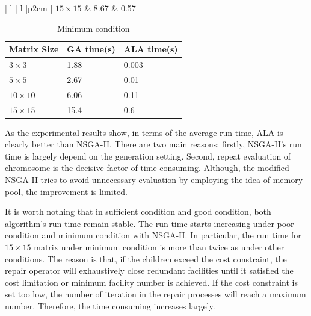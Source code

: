 \documentclass{llncs}
\begin{document}
\begin{table}[!htb]
\begin{minipage}{.5\linewidth}
\begin{tabular}{ | l | l |p{2cm} |}
		$15 \times 15$  & 8.67 & 0.57\\ \hline
	\end{tabular}
	\end{minipage}
	\label{table:poor}
\begin{minipage}{.5\linewidth}
	\caption{Minimum condition}
	\begin{tabular}{ | l | l |p{2cm} |}
		\hline
		Matrix Size & GA time(s) & ALA time(s)\\ \hline
		$3 \times 3$  & 1.88 & 0.003\\ \hline
		$5 \times 5$  & 2.67 & 0.01 \\ \hline
		$10 \times 10$ &6.06 & 0.11\\ \hline
		$15 \times 15$  & 15.4 & 0.6\\ \hline
	\end{tabular}
	\end{minipage}
	\label{table:minimum}
\end{table}

As the experimental results show, in terms of the average run time, ALA is clearly better than NSGA-II. 
There are two main reasons: firstly, NSGA-II's run time is largely depend on the generation setting.
Second, repeat evaluation of chromosome is the decisive factor of time consuming. Although, the modified
NSGA-II tries to avoid unnecessary evaluation by employing the idea of memory pool, the improvement is limited. 

It is worth nothing that in sufficient condition and good condition, both algorithm's run time remain stable. The run time starts
increasing under poor condition and minimum condition with NSGA-II. In particular, the run time for $15 \times 15$ matrix under 
minimum condition is more than twice as under other conditions.  The reason is that, if the children exceed the cost constraint, 
the repair operator will exhaustively close redundant facilities until it satisfied the cost limitation or minimum facility 
number is achieved. If the cost constraint is set too low, the number of iteration in the repair 
processes will reach a maximum number. Therefore, the time consuming increases largely.
\end{document}
